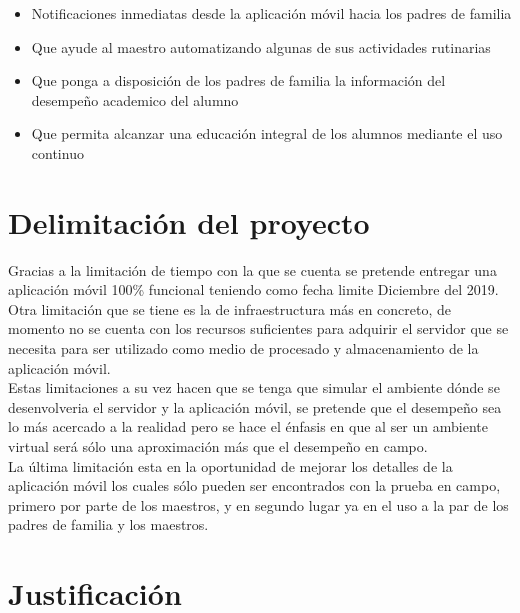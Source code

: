         \begin{itemize} 
        
            \item Notificaciones inmediatas desde la aplicación móvil hacia los padres de familia
            
            \item Que ayude al maestro automatizando algunas de sus actividades rutinarias 
            
            \item Que ponga a disposición de los padres de familia la información del desempeño academico del alumno
            
            \item Que permita alcanzar una educación integral de los alumnos mediante el uso continuo 
            
        \end{itemize}


    \section{Delimitación del proyecto} \label{delimitacionproyecto}

        Gracias a la limitación de tiempo con la que se cuenta se pretende entregar una aplicación móvil 100\% funcional teniendo como fecha limite Diciembre del 2019. Otra limitación que se tiene es la de infraestructura más en concreto, de momento no se cuenta con los recursos suficientes para adquirir el servidor que se necesita para ser utilizado como medio de procesado y almacenamiento de la aplicación móvil. \\ Estas limitaciones a su vez hacen que se tenga que simular el ambiente dónde se desenvolveria el servidor y la aplicación móvil, se pretende que el desempeño sea lo más acercado a la realidad pero se hace el énfasis en que al ser un ambiente virtual será sólo una aproximación más que el desempeño en campo. \\ La última limitación esta en la oportunidad de mejorar los detalles de la aplicación móvil los cuales sólo pueden ser encontrados con la prueba en campo, primero por parte de los maestros, y en segundo lugar ya en el uso a la par de los padres de familia y los maestros.


    \section{Justificación} \label{justificacion}

